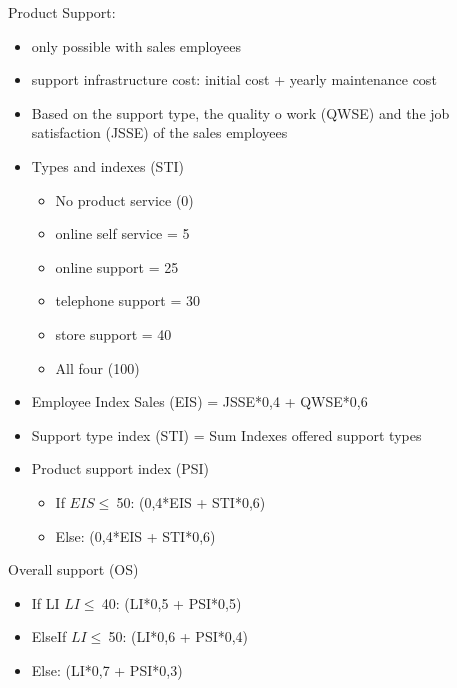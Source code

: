 Product Support:
\begin{itemize}
\item only possible with sales employees 
\item support infrastructure cost: initial cost + yearly maintenance cost  
\item Based on the support type, the quality o work (QWSE) and the job satisfaction (JSSE) of the sales employees
\item Types and indexes (STI)
\begin{itemize}
\item No product service (0)
\item online self service = 5
\item online support = 25
\item telephone support = 30  
\item store support = 40
\item All four (100)
\end{itemize}
\item Employee Index Sales (EIS) = JSSE*0,4 + QWSE*0,6
\item Support type index (STI) = Sum Indexes offered support types
\item Product support index (PSI) 
\begin{itemize}
\item If $EIS \leq \ $50: (0,4*EIS + STI*0,6)
\item Else: (0,4*EIS + STI*0,6)
\end{itemize}
\end{itemize}

Overall support (OS)
\begin{itemize}
\item If LI $LI \leq \ $40: (LI*0,5 + PSI*0,5)
\item ElseIf $LI \leq \ $50: (LI*0,6 + PSI*0,4)
\item Else: (LI*0,7 + PSI*0,3)
\end{itemize}